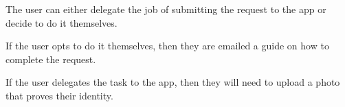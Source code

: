 \begin{minipage}{\textwidth}
  \centering
  \begin{minipage}[t]{4.6cm}
    \vspace{0pt}
    \centering
    \begin{minipage}{4.4cm}
      The user can either delegate the job of submitting the request to the app or decide to do it themselves.
    \end{minipage}
  \end{minipage}
  \begin{minipage}[t]{4.6cm}
    \vspace{0pt}
    \centering
    \begin{minipage}{4.4cm}
      If the user opts to do it themselves, then they are emailed a guide on how to complete the request.
    \end{minipage}
  \end{minipage}
  \begin{minipage}[t]{4.6cm}
    \vspace{0pt}
    \centering
    \begin{minipage}{4.4cm}
      If the user delegates the task to the app, then they will need to upload a photo that proves their identity.
    \end{minipage}
  \end{minipage}
\end{minipage}

